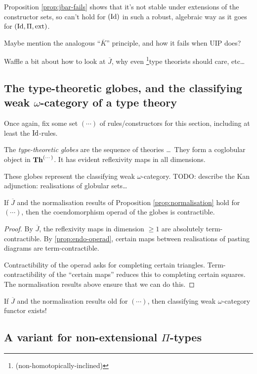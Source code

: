 \documentclass{amsart}
\newcommand{\ext}{\mathrm{ext}}
\newcommand{\Jbar}{\overline{J}}
\newcommand{\stuff}{{(\cdots)}}
\begin{document}
Proposition \ref{prop:jbar-fails} shows that it's not stable under extensions of the constructor sets, so can't hold for $(\mathrm{Id})$ in such a robust, algebraic way as it goes for $(\Id,\Pi,\ext)$.

Maybe mention the analogous ``$\overline{K}$'' principle, and how it fails when UIP does?

Waffle a bit about how to look at $\Jbar$, why even \footnote{(non-homotopically-inclined)}type theorists should care, etc\ldots

\subsection{The type-theoretic globes, and the classifying weak $\omega$-category of a type theory}

Once again, fix some set $\stuff$ of rules/constructors for this section, including at least the $\mathrm{Id}$-rules.

The \emph{type-theoretic globes} are the sequence of theories \ldots\ They form a coglobular object in $\Th^\stuff$.  It has evident reflexivity maps in all dimensions.

These globes represent the classifying weak $\omega$-category.  TODO: describe the Kan adjunction: realisations of globular sets\ldots

\begin{proposition}If $\Jbar$ and the normalisation results of Proposition \ref{prop:normalisation} hold for $\stuff$, then the coendomorphism operad of the globes is contractible.
\end{proposition}

\begin{proof}By $\Jbar$, the reflexivity maps in dimension $\geq 1$ are absolutely term-contractible.  By \ref{prop:endo-operad}, certain maps between realisations of pasting diagrams are term-contractible.

Contractibility of the operad asks for completing certain triangles.  Term-contractibility of the ``certain maps'' reduces this to completing certain squares.  The normalisation results above ensure that we can do this.  
\end{proof}

\begin{corollary}If $\Jbar$ and the normalisation results old for $\stuff$, then classifying weak $\omega$-category functor exists!
\end{corollary}

\subsection{A variant for non-extensional $\Pi$-types}
\end{document}
